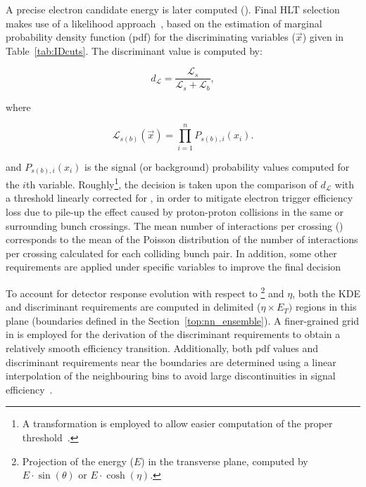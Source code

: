   


A precise electron candidate energy is later computed (\hltcalo). Final HLT selection makes use of a likelihood
approach~\cite{ATL-COM-PHYS-2017-1012,ATLAS-PERF-2017-01-002}, based on the estimation of marginal probability density function (pdf) for the discriminating variables ($\vec{x}$) given in Table~\ref{tab:IDcuts}. The discriminant value is computed by:




\begin{equation}
  d_{\mathcal{L}} = \frac{\mathcal{L}_{s}}{\mathcal{L}_{s} + \mathcal{L}_{b}},
\end{equation}
  
\noindent where
  
\begin{equation}
\mathcal{L}_{s(b)}(\vec{x}) = \prod_{i=1}^{n} P_{s(b),i}(x_i).
\label{eq:likelihoods}
\end{equation}



\noindent and $P_{s(b),i}(x_i)$ is the signal (or background) probability values computed for the $i$th variable. Roughly\footnote{A transformation is employed to allow
easier computation of the proper threshold~\cite{aaboud2019electron}.},
the decision is taken upon the comparison of $d_{\mathcal{L}}$ with a
threshold linearly corrected for \avgmu{}, in order to mitigate electron trigger
efficiency loss due to pile-up the effect caused by proton-proton collisions in the same or surrounding bunch crossings. The mean number of interactions per crossing (\avgmu{}) corresponds to the
mean of the Poisson distribution of the number of interactions per crossing calculated for each colliding bunch pair. In addition, some other requirements are
applied under specific variables to improve the final
decision~\cite{aaboud2019electron}

To account for detector response evolution with
respect to \Et\footnote{Projection of the energy ($E$) in the transverse plane,
computed by $E\cdot\sin(\theta)$ or $E\cdot\cosh(\eta)$.} and
$\eta$, both the KDE and discriminant requirements are computed in delimited ($\eta\times E_{T})$
regions in this plane (boundaries defined in the Section~\ref{top:nn_ensemble}).
A finer-grained grid in \Et is employed for the derivation of the discriminant
requirements to obtain a relatively smooth efficiency transition. Additionally,
both pdf values and discriminant requirements near the boundaries are determined
using a linear interpolation of the neighbouring bins to avoid large
discontinuities in signal efficiency~\cite{aaboud2019electron}.

